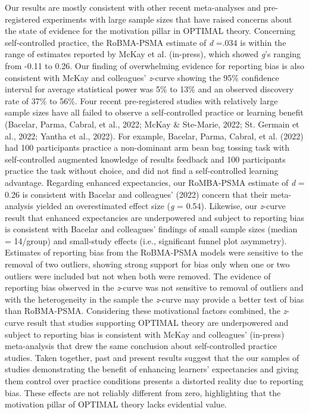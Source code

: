 \documentclass[
  doc, donotrepeattitle,floatsintext]{apa7}
\begin{document}
Our results are mostly consistent with other recent meta-analyses and pre-registered experiments with large sample sizes that have raised concerns about the state of evidence for the motivation pillar in OPTIMAL theory. Concerning self-controlled practice, the RoBMA-PSMA estimate of \emph{d} =.034 is within the range of estimates reported by McKay et al. (in-press), which showed \emph{g}'s ranging from -0.11 to 0.26. Our finding of overwhelming evidence for reporting bias is also consistent with McKay and colleagues' \emph{z}-curve showing the 95\% confidence interval for average statistical power was 5\% to 13\% and an observed discovery rate of 37\% to 56\%. Four recent pre-registered studies with relatively large sample sizes have all failed to observe a self-controlled practice or learning benefit (Bacelar, Parma, Cabral, et al., 2022; McKay \& Ste-Marie, 2022; St. Germain et al., 2022; Yantha et al., 2022). For example, Bacelar, Parma, Cabral, et al. (2022) had 100 participants practice a non-dominant arm bean bag tossing task with self-controlled augmented knowledge of results feedback and 100 participants practice the task without choice, and did not find a self-controlled learning advantage. Regarding enhanced expectancies, our RoMBA-PSMA estimate of \emph{d} = 0.26 is consistent with Bacelar and colleagues' (2022) concern that their meta-analysis yielded an overestimated effect size (\emph{g} = 0.54). Likewise, our \emph{z}-curve result that enhanced expectancies are underpowered and subject to reporting bias is consistent with Bacelar and colleagues' findings of small sample sizes (median = 14/group) and small-study effects (i.e., significant funnel plot asymmetry). Estimates of reporting bias from the RoBMA-PSMA models were sensitive to the removal of two outliers, showing strong support for bias only when one or two outliers were included but not when both were removed. The evidence of reporting bias observed in the \emph{z}-curve was not sensitive to removal of outliers and with the heterogeneity in the sample the \emph{z}-curve may provide a better test of bias than RoBMA-PSMA. Considering these motivational factors combined, the \emph{z}-curve result that studies supporting OPTIMAL theory are underpowered and subject to reporting bias is consistent with McKay and colleagues' (in-press) meta-analysis that drew the same conclusion about self-controlled practice studies. Taken together, past and present results suggest that the our samples of studies demonstrating the benefit of enhancing learners' expectancies and giving them control over practice conditions presents a distorted reality due to reporting bias. These effects are not reliably different from zero, highlighting that the motivation pillar of OPTIMAL theory lacks evidential value.
\end{document}
